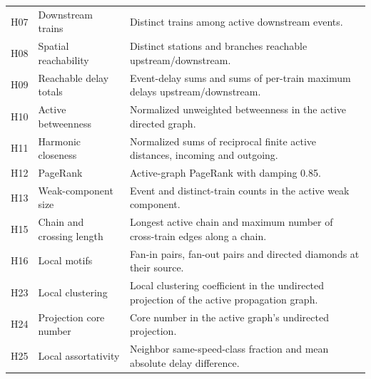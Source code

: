 \begin{longtable}{@{}>{\raggedright\arraybackslash}p{0.8cm}>{\raggedright\arraybackslash}p{3.7cm}>{\raggedright\arraybackslash}p{10.0cm}@{}}
H07 & Downstream trains & Distinct trains among active downstream events. \\
H08 & Spatial reachability & Distinct stations and branches reachable upstream/downstream. \\
H09 & Reachable delay totals & Event-delay sums and sums of per-train maximum delays upstream/downstream. \\
H10 & Active betweenness & Normalized unweighted betweenness in the active directed graph. \\
H11 & Harmonic closeness & Normalized sums of reciprocal finite active distances, incoming and outgoing. \\
H12 & PageRank & Active-graph PageRank with damping 0.85. \\
H13 & Weak-component size & Event and distinct-train counts in the active weak component. \\
H15 & Chain and crossing length & Longest active chain and maximum number of cross-train edges along a chain. \\
H16 & Local motifs & Fan-in pairs, fan-out pairs and directed diamonds at their source. \\
H23 & Local clustering & Local clustering coefficient in the undirected projection of the active propagation graph. \\
H24 & Projection core number & Core number in the active graph's undirected projection. \\
H25 & Local assortativity & Neighbor same-speed-class fraction and mean absolute delay difference. \\
\end{longtable}
\endgroup
